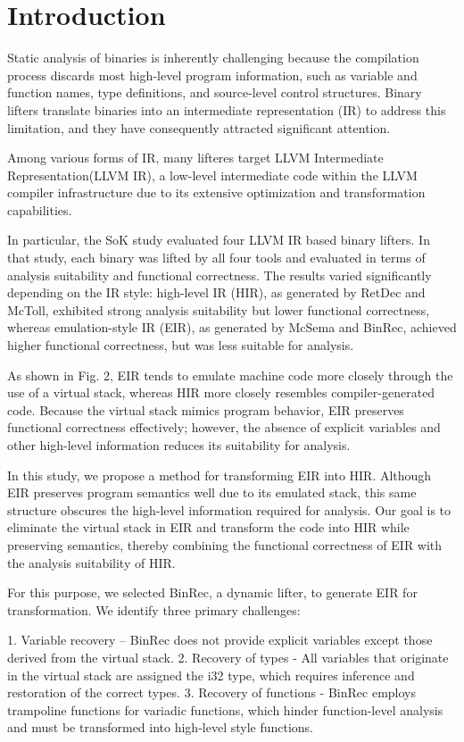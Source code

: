 \section{Introduction}
Static analysis of binaries is inherently challenging because the compilation
process discards most high-level program information, such as variable and
function names, type definitions, and source-level control structures. Binary
lifters translate binaries into an intermediate representation (IR) to address
this limitation, and they have consequently attracted significant attention.

Among various forms of IR, many lifteres target LLVM Intermediate
Representation(LLVM IR), a low-level intermediate code within the LLVM compiler
infrastructure due to its extensive optimization and transformation
capabilities. 

In particular, the SoK study evaluated four LLVM IR based binary lifters. In
that study, each binary was lifted by all four tools and evaluated in terms of
analysis suitability and functional correctness. The results varied
significantly depending on the IR style: high-level IR (HIR), as generated by
RetDec and McToll, exhibited strong analysis suitability but lower functional
correctness, whereas emulation-style IR (EIR), as generated by McSema and
BinRec, achieved higher functional correctness, but was less suitable for
analysis.

As shown in Fig. 2, EIR tends to emulate machine code more closely through the
use of a virtual stack, whereas HIR more closely resembles compiler-generated
code. Because the virtual stack mimics program behavior, EIR preserves
functional correctness effectively; however, the absence of explicit variables
and other high-level information reduces its suitability for analysis.

In this study, we propose a method for transforming EIR into HIR. Although EIR
preserves program semantics well due to its emulated stack, this same structure
obscures the high-level information required for analysis. Our goal is to
eliminate the virtual stack in EIR and transform the code into HIR while
preserving semantics, thereby combining the functional correctness of EIR with
the analysis suitability of HIR.

For this purpose, we selected BinRec, a dynamic lifter, to generate EIR for
transformation. We identify three primary challenges:

1. Variable recovery – BinRec does not provide explicit variables except those
derived from the virtual stack. 2. Recovery of types - All variables that
originate in the virtual stack are assigned the i32 type, which requires
inference and restoration of the correct types. 3. Recovery of functions -
BinRec employs trampoline functions for variadic functions, which hinder
function-level analysis and must be transformed into high-level style
functions.

